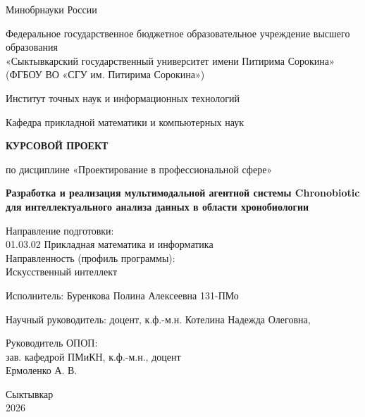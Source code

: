\documentclass[a4paper,14pt]{extarticle}
\begin{document}
	
	\begin{titlepage}
		\begin{center}
			\large{Минобрнауки России}
			
			\large{Федеральное государственное бюджетное образовательное учреждение высшего образования\\
				«Сыктывкарский государственный университет имени Питирима Сорокина»\\
				(ФГБОУ ВО «СГУ им. Питирима Сорокина»)}
			
			\large{Институт точных наук и информационных технологий}
			
			\large{Кафедра прикладной математики и компьютерных наук}
			
			\vspace{4cm}
			
			\textbf{\Large{КУРСОВОЙ ПРОЕКТ}}
			
			\large{по дисциплине «Проектирование в профессиональной сфере»}
			
			\vspace{1cm}
			
			\textbf{\Large{Разработка и реализация мультимодальной агентной системы Chronobiotic для интеллектуального анализа данных в области хронобиологии}}
			
			\vspace{1.5cm}
			
			\begin{flushleft}
				\large{Направление подготовки:\\
					01.03.02 Прикладная математика и информатика\\
					Направленность (профиль программы):\\
					Искусственный интеллект}
			\end{flushleft}
			
			\vspace{2cm}
			
			\begin{flushleft}
				\large{Исполнитель: Буренкова Полина Алексеевна 131-ПМо\\
					\underline{\hspace{5cm}}}
				
				\large{Научный руководитель: доцент, к.ф.-м.н. Котелина Надежда Олеговна,\\
					\underline{\hspace{5cm}}}
				
				\vspace{1.5cm}
				
				\large{Руководитель ОПОП:\\
					зав. кафедрой ПМиКН, к.ф.-м.н., доцент\\
					Ермоленко А. В. \underline{\hspace{3cm}}}
			\end{flushleft}
			
			\vfill
			
			\large{Сыктывкар\\2026}
		\end{center}
	\end{titlepage}
	
\end{document}
